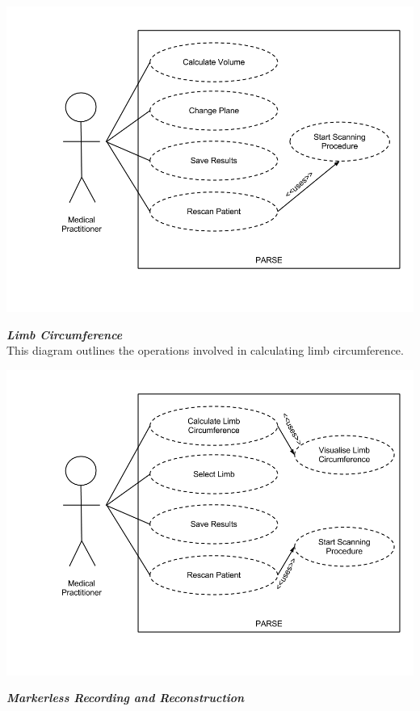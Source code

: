 \begin{center}
    \includegraphics[scale=0.275]{images/uml2.png}
\end{center}

\emph{\bf{Limb Circumference}}\\

This diagram outlines the operations involved in calculating limb circumference. \\

\begin{center}
    \includegraphics[scale=0.275]{images/uml3.png}
\end{center}

\emph{\bf{Markerless Recording and Reconstruction}}\\

